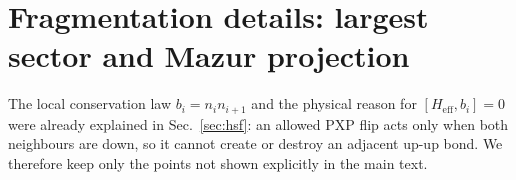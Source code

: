 \documentclass[aps,prb,reprint,twocolumn,amsmath,amssymb,citeautoscript]{revtex4-2}
\begin{document}

\section{Fragmentation details: largest sector and Mazur projection}
\label{app:HSF}

The local conservation law
\(
b_i=n_i n_{i+1}
\)
and the physical reason for
\(
[H_{\mathrm{eff}},b_i]=0
\)
were already explained in Sec.~\ref{sec:hsf}: an allowed PXP flip acts only when both neighbours are down, so it cannot create or destroy an adjacent up-up bond. We therefore keep only the points not shown explicitly in the main text.
\end{document}
